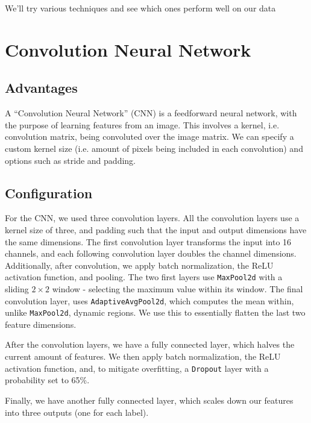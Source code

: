 \documentclass[12pt,a4paper,english]{article}
\begin{document}
    We'll try various techniques and see which ones perform well on our data

    \section{Convolution Neural Network}

    \subsection{Advantages}

    A ``Convolution Neural Network'' (CNN) is a feedforward neural network, with the purpose of learning features from an image.
    This involves a kernel, i.e. convolution matrix, being convoluted over the image matrix. We can specify a custom kernel size
    (i.e. amount of pixels being included in each convolution) and options such as stride and padding.

    \cite{enwiki:1349825931}
    \cite{dumoulin2016guide}

    \subsection{Configuration} \label{sec:cnn_configuration}

    For the CNN, we used three convolution layers. All the convolution layers use a kernel size of three, and padding such that the input and output dimensions have
    the same dimensions. The first convolution layer transforms the input into 16 channels, and each following convolution layer doubles the channel dimensions.
    Additionally, after convolution, we apply batch normalization, the ReLU activation function, and pooling.
    The two first layers use \verb|MaxPool2d| with a sliding $2 \times 2$ window - selecting the maximum value within its window.
    The final convolution layer, uses \verb|AdaptiveAvgPool2d|, which computes the mean within, unlike \verb|MaxPool2d|, dynamic regions.
    We use this to essentially flatten the last two feature dimensions.

    After the convolution layers, we have a fully connected layer, which halves the current amount of features.
    We then apply batch normalization, the ReLU activation function, and, to mitigate overfitting, a \verb|Dropout| layer with a probability set to 65\%.

    Finally, we have another fully connected layer, which scales down our features into three outputs (one for each label).
\end{document}

